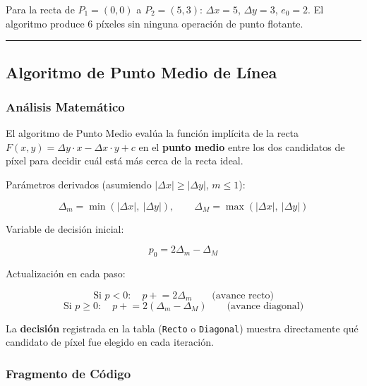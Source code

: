 \documentclass[
  spanish,
  a4paper,
  12pt,
]{article}
\newcommand{\passthrough}[1]{#1}
\begin{document}
Para la recta de \(P_1=(0,0)\) a \(P_2=(5,3)\): \(\Delta x=5\),
\(\Delta y=3\), \(e_0=2\). El algoritmo produce 6 píxeles sin ninguna
operación de punto flotante.

\begin{center}\rule{0.5\linewidth}{0.5pt}\end{center}

\subsection{Algoritmo de Punto Medio de
Línea}\label{algoritmo-de-punto-medio-de-luxednea}

\subsubsection{Análisis
Matemático}\label{anuxe1lisis-matemuxe1tico-2}

El algoritmo de Punto Medio evalúa la función implícita de la recta
\(F(x,y) = \Delta y \cdot x - \Delta x \cdot y + c\) en el \textbf{punto
medio} entre los dos candidatos de píxel para decidir cuál está más
cerca de la recta ideal.

Parámetros derivados (asumiendo \(|\Delta x| \geq |\Delta y|\),
\(m \leq 1\)):

\[\Delta_m = \min(|\Delta x|,\ |\Delta y|), \qquad \Delta_M = \max(|\Delta x|,\ |\Delta y|)\]

Variable de decisión inicial:

\[p_0 = 2\Delta_m - \Delta_M\]

Actualización en cada paso:

\[\text{Si } p < 0: \quad p \mathrel{+}= 2\Delta_m \qquad \text{(avance recto)}\]
\[\text{Si } p \geq 0: \quad p \mathrel{+}= 2(\Delta_m - \Delta_M) \qquad \text{(avance diagonal)}\]

La \textbf{decisión} registrada en la tabla
(\passthrough{\lstinline!Recto!} o \passthrough{\lstinline!Diagonal!})
muestra directamente qué candidato de píxel fue elegido en cada
iteración.

\newpage

\subsubsection{Fragmento de Código}\label{fragmento-de-cuxf3digo-2}
\end{document}
